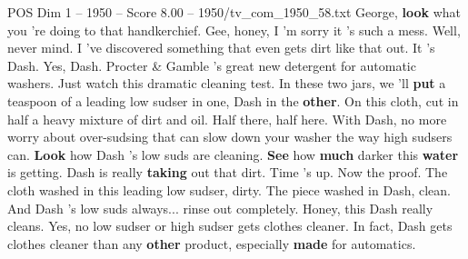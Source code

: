 \begin{textsample}{POS Dim 1 – 1950 – Score 8.00 – 1950/tv\_com\_1950\_58.txt}  \label{ex:f1_pos_020}
George, \textbf{look} what you 're doing to that handkerchief.
Gee, honey, I 'm sorry it 's such a mess.
Well, never mind.
I 've discovered something that even gets dirt like that out.
It 's Dash.
Yes, Dash.
Procter \& Gamble 's great new detergent for automatic washers.
Just watch this dramatic cleaning test.
In these two jars, we 'll \textbf{put} a teaspoon of a leading low sudser in one, Dash in the \textbf{other}.
On this cloth, cut in half a heavy mixture of dirt and oil.
Half there, half here.
With Dash, no more worry about over-sudsing that can slow down your washer the way high sudsers can. \textbf{Look} how Dash 's low suds are cleaning. \textbf{See} how \textbf{much} darker this \textbf{water} is getting.
Dash is really \textbf{taking} out that dirt.
Time 's up.
Now the proof.
The cloth washed in this leading low sudser, dirty.
The piece washed in Dash, clean.
And Dash 's low suds always... rinse out completely.
Honey, this Dash really cleans.
Yes, no low sudser or high sudser gets clothes cleaner.
In fact, Dash gets clothes cleaner than any \textbf{other} product, especially \textbf{made} for automatics.

\end{textsample}
